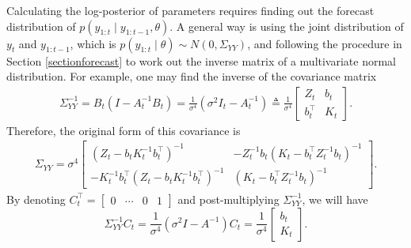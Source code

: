 Calculating the log-posterior of parameters requires finding out the forecast distribution of $p(y_{1:t}\mid y_{1:t-1},\theta)$. A general way is using the joint distribution of $y_{t}$ and $y_{1:t-1}$, which is $p(y_{1:t}\mid \theta)\sim N(0,\Sigma_{YY})$, and following the procedure in Section \ref{sectionforecast} to work out the inverse matrix of a multivariate normal distribution. For example, one may find the inverse of the covariance matrix 
\begin{align*}
\Sigma_{YY}^{-1} = B_t(I-A_t^{-1}B_t) =\frac{1}{\sigma^4}(\sigma^2 I_t-A_t^{-1}) \triangleq \frac{1}{\sigma^4} \left[\begin{matrix} 
Z_{t} & b_{t} \\
b_{t}^\top & K_{t}
\end{matrix} \right].
\end{align*}
Therefore, the original form of this covariance is 
\begin{align*} \Sigma_{YY} =\sigma^4 \left[ \begin{matrix}
\left(Z_t-b_tK_t^{-1}b_t^\top\right)^{-1} & -Z_t^{-1}b_t\left(K_t-b_t^\top Z_t^{-1}b_t\right)^{-1}\\
-K_t^{-1}b_t^\top \left(Z_t-b_tK_t^{-1}b_t^\top\right)^{-1} & \left(K_t-b_t^\top Z_t^{-1}b_t\right)^{-1}
\end{matrix}\right].
\end{align*}
By denoting $C_{t}^\top = \begin{bmatrix} 0 & \cdots & 0 & 1\end{bmatrix}$ and post-multiplying $\Sigma_{YY}^{-1}$, we will have  
\begin{equation}\label{beforeSMformula}
\Sigma_{YY}^{-1} C_{t}= \frac{1}{\sigma^4}\left(\sigma^2 I-A^{-1} \right)C_{t}= \frac{1}{\sigma^4} \left[\begin{matrix} b_{t} \\ K_{t} \end{matrix} \right].
\end{equation} 


